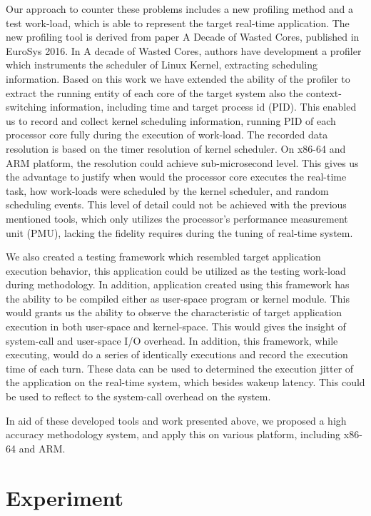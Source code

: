 \documentclass[10pt,a4paper]{article}
\begin{document}
\begin{multicols}{2}
    Our approach to counter these problems includes a new profiling method and a test work-load, which is able to
    represent the target real-time application. The new profiling tool is derived from paper A Decade of Wasted Cores,
    published in EuroSys 2016. In A decade of Wasted Cores, authors have development a profiler which instruments the
    scheduler of Linux Kernel, extracting scheduling information. Based on this work we have extended the ability of the
    profiler to extract the running entity of each core of the target system also the context-switching information,
    including time and target process id (PID). This enabled us to record and collect kernel scheduling information,
    running PID of each processor core fully during the execution of work-load. The recorded data resolution is based on
    the timer resolution of kernel scheduler. On x86-64 and ARM platform, the resolution could achieve sub-microsecond
    level. This gives us the advantage to justify when would the processor core executes the real-time task, how
    work-loads were scheduled by the kernel scheduler, and random scheduling events. This level of detail could not be
    achieved with the previous mentioned tools, which only utilizes the processor's performance measurement unit (PMU),
    lacking the fidelity requires during the tuning of real-time system.

    We also created a testing framework which resembled target application execution behavior, this application could be
    utilized as the testing work-load during methodology. In addition, application created using this framework has the
    ability to be compiled either as user-space program or kernel module. This would grants us the ability to observe
    the characteristic of target application execution in both user-space and kernel-space. This would gives the insight
    of system-call and user-space I/O overhead. In addition, this framework, while executing, would do a series of
    identically executions and record the execution time of each turn. These data can be used to determined the
    execution jitter of the application on the real-time system, which besides wakeup latency. This could be used to
    reflect to the system-call overhead on the system.

    In aid of these developed tools and work presented above, we proposed a high accuracy methodology system, and apply
    this on various platform, including x86-64 and ARM.
    

\section{Experiment}


\begin{thebibliography}{9}%
\end{thebibliography}

\end{multicols}
\end{document}
